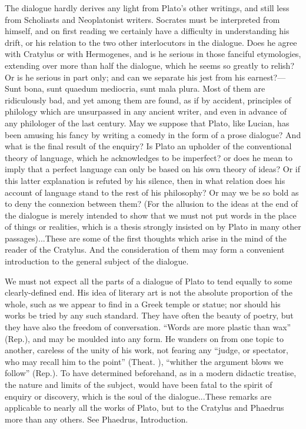 \documentclass[11pt,letter]{article}
\begin{document}
\par  The dialogue hardly derives any light from Plato’s other writings, and still less from Scholiasts and Neoplatonist writers. Socrates must be interpreted from himself, and on first reading we certainly have a difficulty in understanding his drift, or his relation to the two other interlocutors in the dialogue. Does he agree with Cratylus or with Hermogenes, and is he serious in those fanciful etymologies, extending over more than half the dialogue, which he seems so greatly to relish? Or is he serious in part only; and can we separate his jest from his earnest?—Sunt bona, sunt quaedum mediocria, sunt mala plura. Most of them are ridiculously bad, and yet among them are found, as if by accident, principles of philology which are unsurpassed in any ancient writer, and even in advance of any philologer of the last century. May we suppose that Plato, like Lucian, has been amusing his fancy by writing a comedy in the form of a prose dialogue? And what is the final result of the enquiry? Is Plato an upholder of the conventional theory of language, which he acknowledges to be imperfect? or does he mean to imply that a perfect language can only be based on his own theory of ideas? Or if this latter explanation is refuted by his silence, then in what relation does his account of language stand to the rest of his philosophy? Or may we be so bold as to deny the connexion between them? (For the allusion to the ideas at the end of the dialogue is merely intended to show that we must not put words in the place of things or realities, which is a thesis strongly insisted on by Plato in many other passages)...These are some of the first thoughts which arise in the mind of the reader of the Cratylus. And the consideration of them may form a convenient introduction to the general subject of the dialogue.

\par  We must not expect all the parts of a dialogue of Plato to tend equally to some clearly-defined end. His idea of literary art is not the absolute proportion of the whole, such as we appear to find in a Greek temple or statue; nor should his works be tried by any such standard. They have often the beauty of poetry, but they have also the freedom of conversation. “Words are more plastic than wax” (Rep.), and may be moulded into any form. He wanders on from one topic to another, careless of the unity of his work, not fearing any “judge, or spectator, who may recall him to the point” (Theat. ), “whither the argument blows we follow” (Rep.). To have determined beforehand, as in a modern didactic treatise, the nature and limits of the subject, would have been fatal to the spirit of enquiry or discovery, which is the soul of the dialogue...These remarks are applicable to nearly all the works of Plato, but to the Cratylus and Phaedrus more than any others. See Phaedrus, Introduction.
\end{document}

